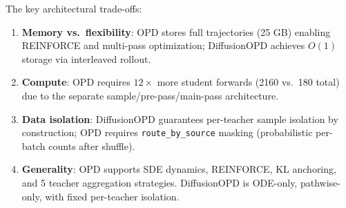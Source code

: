 \documentclass[11pt]{article}
\begin{document}
The key architectural trade-offs:
\begin{enumerate}
    \item \textbf{Memory vs.\ flexibility}: OPD stores full trajectories (25 GB) enabling REINFORCE and multi-pass optimization; DiffusionOPD achieves $O(1)$ storage via interleaved rollout.
    \item \textbf{Compute}: OPD requires $12\times$ more student forwards (2160 vs.\ 180 total) due to the separate sample/pre-pass/main-pass architecture.
    \item \textbf{Data isolation}: DiffusionOPD guarantees per-teacher sample isolation by construction; OPD requires \texttt{route\_by\_source} masking (probabilistic per-batch counts after shuffle).
    \item \textbf{Generality}: OPD supports SDE dynamics, REINFORCE, KL anchoring, and 5 teacher aggregation strategies. DiffusionOPD is ODE-only, pathwise-only, with fixed per-teacher isolation.
\end{enumerate}
\end{document}
